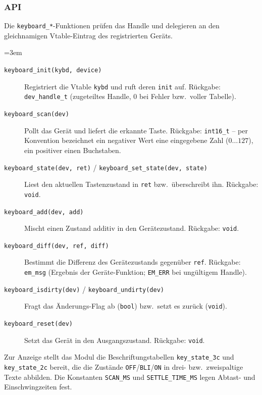 \subsubsection*{API}
Die \verb|keyboard_*|-Funktionen prüfen das Handle und delegieren an den
gleichnamigen Vtable-Eintrag des registrierten Geräts.
{\sloppy\emergencystretch=3em
\begin{description}
\item[\texttt{keyboard\_init(kybd, device)}] Registriert die Vtable
  \verb|kybd| und ruft deren \verb|init| auf. Rückgabe: \verb|dev_handle_t|
  (zugeteiltes Handle, $0$ bei Fehler bzw.\ voller Tabelle).
\item[\texttt{keyboard\_scan(dev)}] Pollt das Gerät und liefert die erkannte
  Taste. Rückgabe: \verb|int16_t| -- per Konvention bezeichnet ein negativer
  Wert eine eingegebene Zahl ($0\dots127$), ein positiver einen Buchstaben.
\item[\texttt{keyboard\_state(dev, ret)} / \texttt{keyboard\_set\_state(dev, state)}]
  Liest den aktuellen Tastenzustand in \verb|ret| bzw.\ überschreibt ihn.
  Rückgabe: \verb|void|.
\item[\texttt{keyboard\_add(dev, add)}] Mischt einen Zustand additiv in den
  Gerätezustand. Rückgabe: \verb|void|.
\item[\texttt{keyboard\_diff(dev, ref, diff)}] Bestimmt die Differenz des
  Gerätezustands gegenüber \verb|ref|. Rückgabe: \verb|em_msg| (Ergebnis der
  Geräte-Funktion; \verb|EM_ERR| bei ungültigem Handle).
\item[\texttt{keyboard\_isdirty(dev)} / \texttt{keyboard\_undirty(dev)}] Fragt
  das Änderungs-Flag ab (\verb|bool|) bzw.\ setzt es zurück (\verb|void|).
\item[\texttt{keyboard\_reset(dev)}] Setzt das Gerät in den Ausgangszustand.
  Rückgabe: \verb|void|.
\end{description}
\par}

\noindent Zur Anzeige stellt das Modul die Beschriftungstabellen
\verb|key_state_3c| und \verb|key_state_2c| bereit, die die Zustände
\verb|OFF|/\verb|BLI|/\verb|ON| in drei- bzw.\ zweispaltige Texte abbilden.
Die Konstanten \verb|SCAN_MS| und \verb|SETTLE_TIME_MS| legen Abtast- und
Einschwingzeiten fest.
